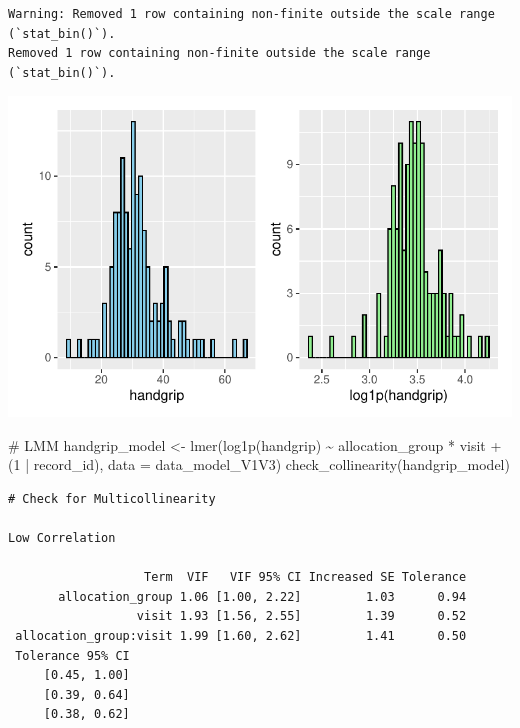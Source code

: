 \documentclass[
  letterpaper,
  DIV=11,
  numbers=noendperiod]{scrartcl}
\newenvironment{Shaded}{\begin{snugshade}}{\end{snugshade}}
\newcommand{\AttributeTok}[1]{\textcolor[rgb]{0.40,0.45,0.13}{#1}}
\newcommand{\CommentTok}[1]{\textcolor[rgb]{0.37,0.37,0.37}{#1}}
\newcommand{\DecValTok}[1]{\textcolor[rgb]{0.68,0.00,0.00}{#1}}
\newcommand{\FunctionTok}[1]{\textcolor[rgb]{0.28,0.35,0.67}{#1}}
\newcommand{\NormalTok}[1]{\textcolor[rgb]{0.00,0.23,0.31}{#1}}
\newcommand{\OtherTok}[1]{\textcolor[rgb]{0.00,0.23,0.31}{#1}}
\newcommand{\SpecialCharTok}[1]{\textcolor[rgb]{0.37,0.37,0.37}{#1}}
\begin{document}
\begin{verbatim}
Warning: Removed 1 row containing non-finite outside the scale range (`stat_bin()`).
Removed 1 row containing non-finite outside the scale range (`stat_bin()`).
\end{verbatim}

\includegraphics{Outcomes_V1V2V3_files/figure-pdf/handgrip_1-1.pdf}

\begin{Shaded}
\begin{Highlighting}[]
\CommentTok{\# LMM}
\NormalTok{handgrip\_model }\OtherTok{\textless{}{-}} \FunctionTok{lmer}\NormalTok{(}\FunctionTok{log1p}\NormalTok{(handgrip) }\SpecialCharTok{\textasciitilde{}}\NormalTok{ allocation\_group }\SpecialCharTok{*}\NormalTok{ visit }\SpecialCharTok{+}\NormalTok{ (}\DecValTok{1} \SpecialCharTok{|}\NormalTok{ record\_id), }\AttributeTok{data =}\NormalTok{ data\_model\_V1V3)}
\FunctionTok{check\_collinearity}\NormalTok{(handgrip\_model)}
\end{Highlighting}
\end{Shaded}

\begin{verbatim}
# Check for Multicollinearity

Low Correlation

                   Term  VIF   VIF 95% CI Increased SE Tolerance
       allocation_group 1.06 [1.00, 2.22]         1.03      0.94
                  visit 1.93 [1.56, 2.55]         1.39      0.52
 allocation_group:visit 1.99 [1.60, 2.62]         1.41      0.50
 Tolerance 95% CI
     [0.45, 1.00]
     [0.39, 0.64]
     [0.38, 0.62]
\end{verbatim}
\end{document}
